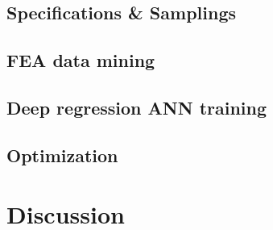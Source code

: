         
        \subsection{Specifications \& Samplings}    \label{Chapter:RSM/LTFM/spec}
        
        
        \subsection{\acs{FEA} data mining}          \label{Chapter:RSM/LTFM/data mining}
        
        
        \subsection{Deep regression ANN training}   \label{Chapter:RSM/LTFM/ANN training}
        
        
        \subsection{Optimization}                   \label{Chapter:RSM/LTFM/Optimization}
    
    
    
    \section{Discussion}                            \label{Chapter:RSM/discussion}
    
